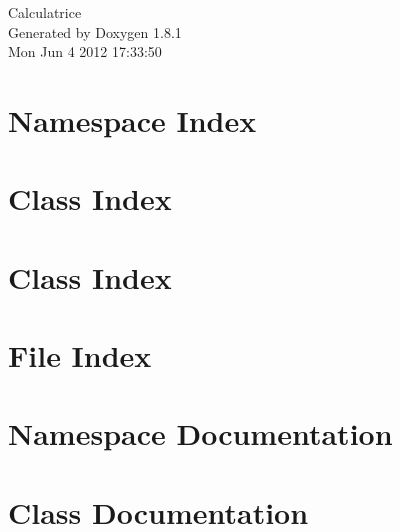 \documentclass{book}
\begin{document}
\hypersetup{pageanchor=false,citecolor=blue}
\begin{titlepage}
\vspace*{7cm}
\begin{center}
{\Large Calculatrice }\\
\vspace*{1cm}
{\large Generated by Doxygen 1.8.1}\\
\vspace*{0.5cm}
{\small Mon Jun 4 2012 17:33:50}\\
\end{center}
\end{titlepage}
\clearemptydoublepage
{}
\tableofcontents
\clearemptydoublepage
{}
\hypersetup{pageanchor=true,citecolor=blue}
\chapter{Namespace Index}

\chapter{Class Index}

\chapter{Class Index}

\chapter{File Index}

\chapter{Namespace Documentation}

\chapter{Class Documentation}

















\end{document}
